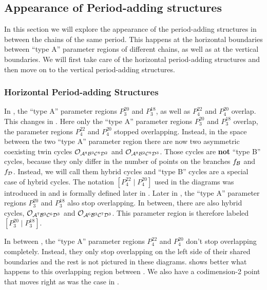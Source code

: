 \subsection{Appearance of Period-adding structures}
\label{sec:add.change.appa}

In this section we will explore the appearance of the period-adding structures in between the chains of the same period.
This happens at the horizontal boundaries between ``type A'' parameter regions of different chains, as well as at the vertical boundaries.
We will first take care of the horizontal period-adding structures and then move on to the vertical period-adding structures.

\subsubsection{Horizontal Period-adding Structures}
\label{sec:add.change.appa.hor}

In , the ``type A'' parameter regions $P^{20}_3$ and $P^{18}_3$, as well as $P^{22}_4$ and $P^{20}_4$ overlap.
This changes in .
Here only the ``type A'' parameter regions $P^{20}_3$ and $P^{18}_3$ overlap, the parameter regions $P^{22}_4$ and $P^{20}_4$ stopped overlapping.
Instead, in the space between the two ``type A'' parameter region there are now two asymmetric coexisting twin cycles $\mathcal{O}_{\mathcal{A}^8\mathcal{B}^3\mathcal{C}^8\mathcal{D}^2}$ and $\mathcal{O}_{\mathcal{A}^8\mathcal{B}^2\mathcal{C}^8\mathcal{D}^3}$.
Those cycles are \textbf{not} ``type B'' cycles, because they only differ in the number of points on the branches $f_{\mathcal{B}}$ and $f_{\mathcal{D}}$.
Instead, we will call them hybrid cycles and ``type B'' cycles are a special case of hybrid cycles.
The notation $\left[P^{22}_4 \mid P^{20}_4\right]$ used in the diagrams was introduced in  and is formally defined later in .
Later in , the ``type A'' parameter regions $P^{20}_3$ and $P^{18}_3$ also stop overlapping.
In between, there are also hybrid cycles, $\mathcal{O}_{\mathcal{A}^7\mathcal{B}^3\mathcal{C}^6\mathcal{D}^3}$ and $\mathcal{O}_{\mathcal{A}^6\mathcal{B}^3\mathcal{C}^7\mathcal{D}^3}$.
This parameter region is therefore labeled $\left[P^{20}_3 \mid P^{18}_3\right]$.

In between , the ``type A'' parameter regions $P^{22}_4$ and $P^{20}_4$ don't stop overlapping completely.
Instead, they only stop overlapping on the left side of their shared boundaries and the rest is not pictured in these diagrams.
 shows better what happens to this overlapping region between .
We also have a codimension-2 point that moves right as was the case in .

